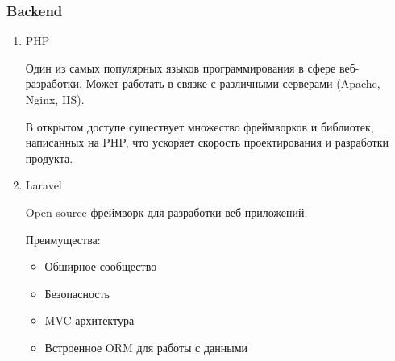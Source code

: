 \documentclass[./tools.tex]{subfiles}
\begin{document}
  \subsubsection{Backend}
  \begin{enumerate}
    \item PHP\\
    \par
    Один из самых популярных языков программирования в сфере веб-разработки. Может работать в связке с различными серверами (Apache, Nginx, IIS).
    \par
    В открытом доступе существует множество фреймворков и библиотек, написанных на PHP, что ускоряет скорость проектирования и разработки продукта.
    \item Laravel\\
    \par
    Open-source фреймворк для разработки веб-приложений.
    \par
    Преимущества:
    \begin{itemize}
      \item Обширное сообщество
      \item Безопасность
      \item MVC архитектура
      \item Встроенное ORM для работы с данными
    \end{itemize}
  \end{enumerate}
\end{document}

